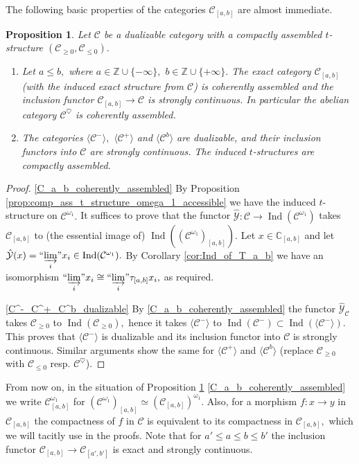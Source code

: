 \documentclass[11pt,leqno]{amsart}
\newtheorem{prop}[theo]{Proposition}
\numberwithin{equation}{section}
\def\C{\mathbb{C}}
\def\Z{\mathbb{Z}}
\newcommand{\indlim}[1][]{\mathop{\varinjlim}\limits_{#1}}
\newcommand{\inddlim}[1][]{{``{\indlim[#1]}"}}
\newcommand{\cC}{{\mathcal C}}
\newcommand{\cY}{{\mathcal Y}}
\newcommand{\la}{\langle}
\newcommand{\ra}{\rangle}
\newcommand{\Ind}{\operatorname{Ind}}
\begin{document}
The following basic properties of the categories $\cC_{[a,b]}$ are almost immediate.

\begin{prop}\label{prop:C_a_b_for_comp_ass_t_structure}
Let $\cC$ be a dualizable category with a compactly assembled $t$-structure $(\cC_{\geq 0},\cC_{\leq 0}).$
\begin{enumerate}[label=(\roman*),ref=(\roman*)]
	\item Let $a\leq b,$ where $a\in\Z\cup\{-\infty\},$ $b\in\Z\cup\{+\infty\}.$ The exact category $\cC_{[a,b]}$ (with the induced exact structure from $\cC$) is coherently assembled and the inclusion functor $\cC_{[a,b]}\to\cC$ is strongly continuous. In particular the abelian category $\cC^{\heartsuit}$ is coherently assembled. \label{C_a_b_coherently_assembled}
	\item The categories $\la\cC^-\ra,$ $\la\cC^+\ra$ and $\la\cC^b\ra$ are dualizable, and their inclusion functors into $\cC$ are strongly continuous. The induced $t$-structures are compactly assembled. \label{C^-_C^+_C^b_dualizable}
\end{enumerate}
\end{prop}

\begin{proof}
\ref{C_a_b_coherently_assembled} By Proposition \ref{prop:comp_ass_t_structure_omega_1_accessible} we have the induced $t$-structure on $\cC^{\omega_1}.$ It suffices to prove that the functor $\hat{\cY}:\cC\to\Ind(\cC^{\omega_1})$ takes $\cC_{[a,b]}$ to (the essential image of) $\Ind((\cC^{\omega_1})_{[a,b]}).$ Let $x\in\C_{[a,b]}$ and let $\hat{\cY}(x)=\inddlim[i]x_i\in\Ind(\cC^{\omega_1}).$ By Corollary \ref{cor:Ind_of_T_a_b} we have an isomorphism $\inddlim[i]x_i\cong\inddlim[i]\tau_{[a,b]}x_i,$ as required.

\ref{C^-_C^+_C^b_dualizable} By \ref{C_a_b_coherently_assembled} the functor $\hat{\cY}_{\cC}$ takes $\cC_{\geq 0}$ to $\Ind(\cC_{\geq 0}),$ hence it takes $\la\cC^-\ra$ to $\Ind(\cC^-)\subset\Ind(\la \cC^-\ra).$ This proves that $\la \cC^-\ra$ is dualizable and its inclusion functor into $\cC$ is strongly continuous. Similar arguments show the same for $\la \cC^+\ra$ and $\la \cC^b\ra$ (replace $\cC_{\geq 0}$ with $\cC_{\leq 0}$ resp. $\cC^{\heartsuit}$).
 \end{proof}

From now on, in the situation of Proposition \ref{prop:C_a_b_for_comp_ass_t_structure} \ref{C_a_b_coherently_assembled} we write $\cC^{\omega_1}_{[a,b]}$ for $(\cC^{\omega_1})_{[a,b]}\simeq (\cC_{[a,b]})^{\omega_1}.$ Also, for a morphism $f:x\to y$ in $\cC_{[a,b]}$ the compactness of $f$ in $\cC$ is equivalent to its compactness in $\cC_{[a,b]},$ which we will tacitly use in the proofs. Note that for $a'\leq a\leq b\leq b'$ the inclusion functor $\cC_{[a,b]}\to\cC_{[a',b']}$ is exact and strongly continuous.
\end{document}
